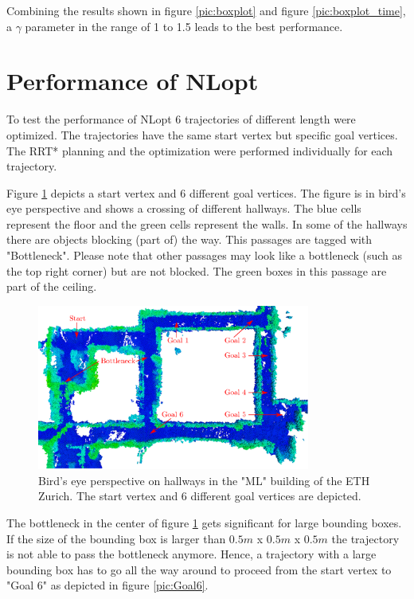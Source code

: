 Combining the results shown in figure \ref{pic:boxplot} and figure \ref{pic:boxplot_time}, a $\gamma$ parameter in the range of 1 to 1.5 leads to the best performance.

\section{Performance of NLopt}

To test the performance of NLopt 6 trajectories of different length were optimized. The trajectories have the same start vertex but specific goal vertices. The RRT* planning and the optimization were performed individually for each trajectory. 

Figure \ref{pic:differentGoal} depicts a start vertex and 6 different goal vertices. The figure is in bird's eye perspective and shows a crossing of different hallways. The blue cells represent the floor and the green cells represent the walls. 
In some of the hallways there are objects blocking (part of) the way. This passages are tagged with "Bottleneck". Please note that other passages may look like a bottleneck (such as the top right corner) but are not blocked. The green boxes in this passage are part of the ceiling.

\begin{figure}[H]
   \centering
   \includegraphics[trim = 14mm 15mm 17mm 0mm,clip,width=0.8\textwidth]{pics/ML4a.eps}
   \caption{Bird's eye perspective on hallways in the "ML" building of the ETH Zurich. The start vertex and 6 different goal vertices are depicted.}
   \label{pic:differentGoal}
\end{figure}

The bottleneck in the center of figure \ref{pic:differentGoal} gets significant for large bounding boxes. If the size of the bounding box is larger than $0.5m$ x $0.5m$ x $0.5m$ the trajectory is not able to pass the bottleneck anymore. Hence, a trajectory with a large bounding box has to go all the way around to proceed from the start vertex to "Goal 6" as depicted in figure \ref{pic:Goal6}.

